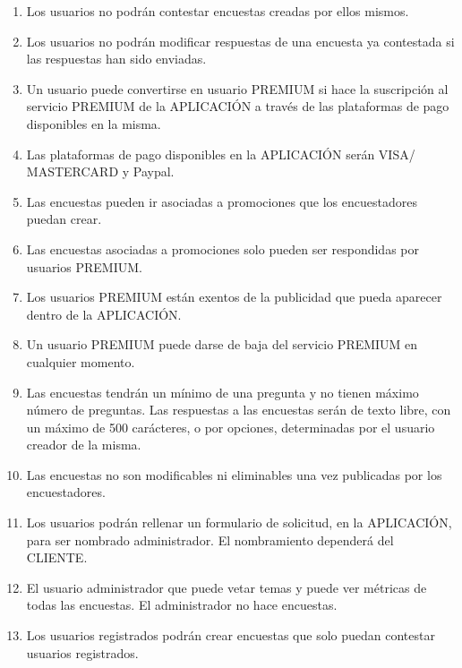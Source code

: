 \documentclass[a4paper,11pt]{report}
\begin{document}
\begin{enumerate}
		\item Los usuarios no podrán contestar encuestas creadas por ellos mismos.

		\item Los usuarios no podrán modificar respuestas de una encuesta ya
		contestada si las respuestas han sido enviadas.

		\item Un usuario puede convertirse en usuario PREMIUM si hace la suscripción
		al servicio PREMIUM de la APLICACIÓN a través de las plataformas de pago
		disponibles en la misma.

		\item Las plataformas de pago disponibles en la APLICACIÓN serán VISA/
		MASTERCARD y Paypal.

		\item Las encuestas pueden ir asociadas a promociones que los encuestadores
		puedan crear.

		\item Las encuestas asociadas a promociones solo pueden ser respondidas por
		usuarios PREMIUM.

		\item Los usuarios PREMIUM están exentos de la publicidad que pueda aparecer
		dentro de la APLICACIÓN.

		\item Un usuario PREMIUM puede darse de baja del servicio PREMIUM en cualquier
		momento.

		\item Las encuestas tendrán un mínimo de una pregunta y no tienen máximo
		número de preguntas. Las respuestas a las encuestas serán de texto libre,
		con un máximo de 500 carácteres, o por opciones, determinadas por el usuario
		creador de la misma.

		\item Las encuestas no son modificables ni eliminables una vez publicadas
		por los encuestadores.

		\item Los usuarios podrán rellenar un formulario de solicitud, en la
		APLICACIÓN, para ser nombrado administrador. El nombramiento dependerá del
		CLIENTE.

		\item El usuario administrador que puede vetar temas y puede ver métricas
		de todas las encuestas. El administrador no hace encuestas.

		\item Los usuarios registrados podrán crear encuestas que solo puedan
		contestar usuarios registrados.


\end{enumerate}
\end{document}
